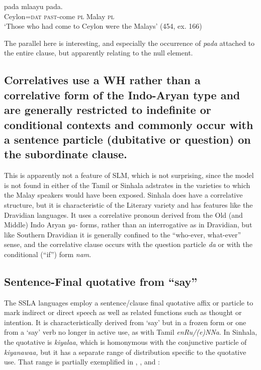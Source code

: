 \ea\label{ex3.3.12} 
\gll  [Seelon=nang anà-dhaatang {\O}] pada mlaayu pada.\\
  Ceylon=\textsc{dat} \textsc{past}-come {}  \textsc{pl} Malay  \textsc{pl}\\
  `Those who had come to Ceylon were the Malays'  (454, ex. 166)
\z


 The parallel here is interesting, and especially the occurrence of \textit{pada} attached to the entire clause, but apparently relating to the null element.

\subsection[Correlatives with interrogative+clitic]{Correlatives use a WH rather than a correlative form of the Indo-Aryan type and are generally restricted to indefinite or conditional contexts and commonly occur with a sentence particle (dubitative or question) on the subordinate clause.}\label{gair:sec:3.4}
 This is apparently not a feature of SLM, which is not surprising, since the model is not found in either of the Tamil or Sinhala adstrates in the varieties to which the Malay speakers would have been exposed.
 Sinhala does have a correlative structure, but it is characteristic of the Literary variety and has features like the Dravidian languages. It uses a correlative pronoun derived from the Old (and Middle) Indo Aryan \textit{ya-}  forms, rather than an interrogative as in Dravidian, but like Southern Dravidian it is generally confined to the ``who-ever, what-ever'' sense, and the correlative clause occurs with the question particle \textit{da} or with the conditional (``if'') form \textit{nam}.

\subsection{Sentence-Final quotative from ``say''}\label{gair:sec:3.5}

The SSLA languages employ a sentence/clause final quotative affix or particle to mark indirect or direct speech as well as related functions such as thought or intention. It is characteristically derived from `say' but in a frozen form or one from a `say' verb no longer in active use, as with Tamil \textit{enRu/(e)NNa}. In Sinhala, the quotative is \textit{kiyalaa}, which is homonymous with the conjunctive particle of \textit{kiyanawaa,} but it has a separate range of distribution specific to the quotative use. That range is partially exemplified in , , and :



